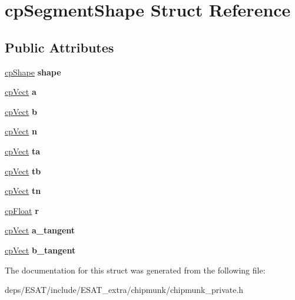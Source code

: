 \hypertarget{structcp_segment_shape}{}\section{cp\+Segment\+Shape Struct Reference}
\label{structcp_segment_shape}
\subsection*{Public Attributes}
\begin{DoxyCompactItemize}
\item 
\mbox{\label{structcp_segment_shape_a297ffe552e3a9d7ae39737826c67d3f9}} 
\mbox{\hyperlink{structcp_shape}{cp\+Shape}} {\bfseries shape}
\item 
\mbox{\label{structcp_segment_shape_a34a7cf4976358bd14bc0dbc662e22794}} 
\mbox{\hyperlink{structcp_vect}{cp\+Vect}} {\bfseries a}
\item 
\mbox{\label{structcp_segment_shape_afa81da45c15f6482058f32ababf3c255}} 
\mbox{\hyperlink{structcp_vect}{cp\+Vect}} {\bfseries b}
\item 
\mbox{\label{structcp_segment_shape_a0698e58f6324e4b040f0616c70e5de21}} 
\mbox{\hyperlink{structcp_vect}{cp\+Vect}} {\bfseries n}
\item 
\mbox{\label{structcp_segment_shape_a7a9a854616a9bd489875be1642d775a5}} 
\mbox{\hyperlink{structcp_vect}{cp\+Vect}} {\bfseries ta}
\item 
\mbox{\label{structcp_segment_shape_a391ea2a44caf04f55cd9301b12193490}} 
\mbox{\hyperlink{structcp_vect}{cp\+Vect}} {\bfseries tb}
\item 
\mbox{\label{structcp_segment_shape_a7114c5b41b18413750ab73852fe45400}} 
\mbox{\hyperlink{structcp_vect}{cp\+Vect}} {\bfseries tn}
\item 
\mbox{\label{structcp_segment_shape_a2db5751e3e61d439a73aad029e568a05}} 
\mbox{\hyperlink{group__basic_types_gac1ed65573e035bf892505768c852d8d3}{cp\+Float}} {\bfseries r}
\item 
\mbox{\label{structcp_segment_shape_a3ba1032e0a8842a0a0eda12e42cb710f}} 
\mbox{\hyperlink{structcp_vect}{cp\+Vect}} {\bfseries a\+\_\+tangent}
\item 
\mbox{\label{structcp_segment_shape_aed400f79a3b1fa176382bb2912b7a0d7}} 
\mbox{\hyperlink{structcp_vect}{cp\+Vect}} {\bfseries b\+\_\+tangent}
\end{DoxyCompactItemize}


The documentation for this struct was generated from the following file\+:\begin{DoxyCompactItemize}
\item 
deps/\+E\+S\+A\+T/include/\+E\+S\+A\+T\+\_\+extra/chipmunk/chipmunk\+\_\+private.\+h\end{DoxyCompactItemize}
